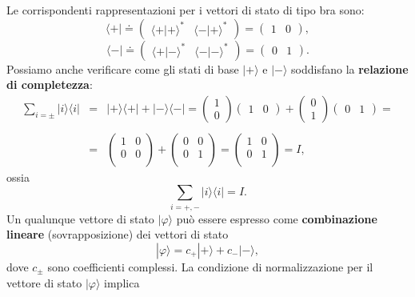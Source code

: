 \documentclass[a4paper,12pt,oneside]{book}
\begin{document}
Le corrispondenti rappresentazioni per i vettori di stato di tipo bra sono:
	\begin{equation}
		\langle + | \doteq
		\begin{pmatrix}
		\langle + | + \rangle ^* & \langle - | + \rangle ^* 
		\end{pmatrix} = 
		\begin{pmatrix}
		1 & 0
		\end{pmatrix} ,
		\end{equation}
		\begin{equation}
		\langle - |  \doteq
		\begin{pmatrix}
		\langle + | - \rangle ^* & \langle - | - \rangle ^* 
		\end{pmatrix} = 
		\begin{pmatrix}
		0 & 1
		\end{pmatrix} .
	\end{equation}
Possiamo anche verificare come gli stati di base $| + \rangle $ e $| - \rangle$ soddisfano la \textbf{relazione di completezza}:
	\begin{eqnarray}
		\sum \limits_{i=\pm} | i \rangle \langle i |  & = & | + \rangle \langle + |  + | - \rangle \langle - |  = 
		\begin{pmatrix}
		1 \\
		0
		\end{pmatrix}
		\begin{pmatrix}
		1 & 0
		\end{pmatrix} + 
		\begin{pmatrix}
		0 \\
		1
		\end{pmatrix}
		\begin{pmatrix}
		0 & 1
		\end{pmatrix}= \nonumber  \\
		\nonumber \\
		& = & \begin{pmatrix}
		1 & 0 \\
		0 & 0 \\
		\end{pmatrix}+
		\begin{pmatrix}
		0 & 0 \\
		0 & 1 \\
		\end{pmatrix}=
		\begin{pmatrix}
		1 & 0 \\
		0 & 1 \\
		\end{pmatrix}=  I  ,
	\end{eqnarray}
ossia
	\begin{equation}
		\boxed{
			\sum \limits_{i=+,-} | i \rangle \langle i | = I .
			}
	\end{equation}
Un qualunque vettore di stato $| \varphi \rangle $ può essere espresso come \textbf{combinazione lineare} (sovrapposizione) dei vettori di stato
	\begin{equation}
		\boxed{
			| \varphi \rangle = c_+ | + \rangle + c_- | - \rangle ,
			}
	\end{equation}
dove $c_{\pm}$ sono coefficienti complessi. La condizione di normalizzazione per il vettore di stato $ | \varphi \rangle $ implica
\end{document}
